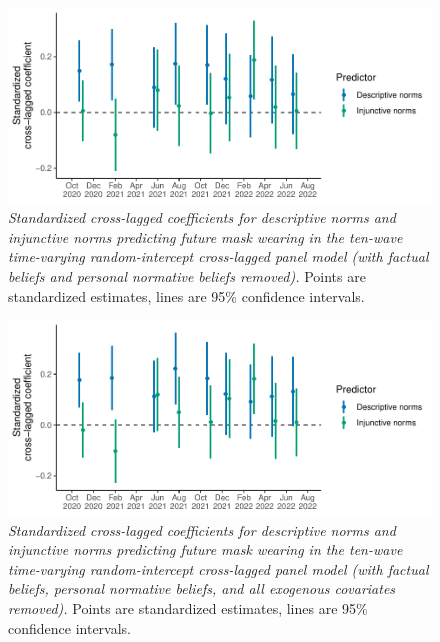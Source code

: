 \documentclass[
  man, donotrepeattitle,floatsintext]{apa6}
\begin{document}
\newpage



\begin{figure}
\centering
\includegraphics{manuscript_files/figure-latex/plotRICLPMCoef2-1.pdf}
\caption{\label{fig:plotRICLPMCoef2}\emph{Standardized cross-lagged coefficients for descriptive norms and injunctive norms predicting future mask wearing in the ten-wave time-varying random-intercept cross-lagged panel model (with factual beliefs and personal normative beliefs removed).} Points are standardized estimates, lines are 95\% confidence intervals.}
\end{figure}

\newpage



\begin{figure}
\centering
\includegraphics{manuscript_files/figure-latex/plotRICLPMCoef3-1.pdf}
\caption{\label{fig:plotRICLPMCoef3}\emph{Standardized cross-lagged coefficients for descriptive norms and injunctive norms predicting future mask wearing in the ten-wave time-varying random-intercept cross-lagged panel model (with factual beliefs, personal normative beliefs, and all exogenous covariates removed).} Points are standardized estimates, lines are 95\% confidence intervals.}
\end{figure}
\end{document}
